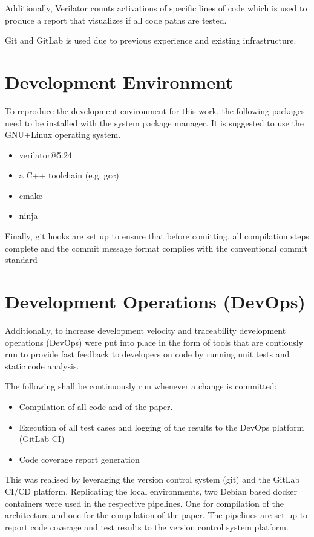 Additionally, Verilator counts activations of specific lines of code which is used to produce a report that visualizes if all code paths are tested.

Git and GitLab is used due to previous experience and existing infrastructure.

% 

\section{Development Environment}
To reproduce the development environment for this work, the following packages need to be installed with the system package manager. It is suggested to use the GNU+Linux operating system. 

\begin{itemize}
  \item verilator@5.24
  \item a C++ toolchain (e.g. gcc)
  \item cmake
  \item ninja
\end{itemize}
  

Finally, git hooks are set up to ensure that before comitting, all compilation steps complete and the commit message format complies with the conventional commit standard \cite{conventionalcommit}

\section{Development Operations (DevOps)}
Additionally, to increase development velocity and traceability development operations (DevOps) were put into place in the form of tools that are contiously run to provide fast feedback to developers on code by running unit tests and static code analysis. 

The following shall be continuously run whenever a change is committed:

\begin{itemize}
  \item Compilation of all code and of the paper.  
  \item Execution of all test cases and logging of the results to the DevOps platform (GitLab CI)
  \item Code coverage report generation
\end{itemize}

This was realised by leveraging the version control system (git) and the GitLab CI/CD platform. Replicating the local environments, two Debian based docker containers \cite{dockerVerilator} \cite{dockerLatex} were used in the respective pipelines. One for compilation of the architecture and one for the compilation of the paper. The pipelines are set up to report code coverage and test results to the version control system platform. 

